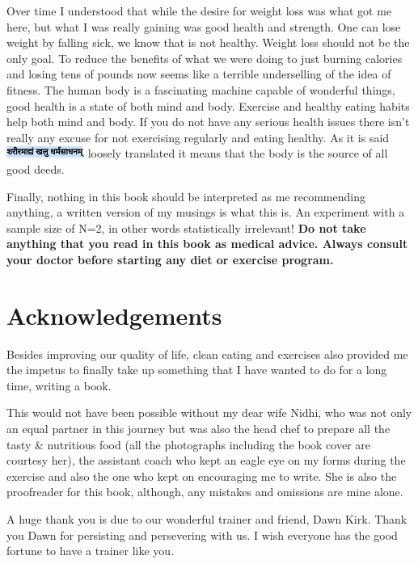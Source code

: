\documentclass[
  oneside]{book}
\begin{document}
Over time I understood that while the desire for weight loss was what got me here, but what I was really gaining was good health and strength. One can lose weight by falling sick, we know that is not healthy. Weight loss should not be the only goal. To reduce the benefits of what we were doing to just burning calories and losing tens of pounds now seems like a terrible underselling of the idea of fitness. The human body is a fascinating machine capable of wonderful things, good health is a state of both mind and body. Exercise and healthy eating habits help both mind and body. If you do not have any serious health issues there isn't really any excuse for not exercising regularly and eating healthy. As it is said \includegraphics{pictures/sanskrit1.png} loosely translated it means that the body is the source of all good deeds.

Finally, nothing in this book should be interpreted as me recommending anything, a written version of my musings is what this is. An experiment with a sample size of N=2, in other words statistically irrelevant! \textbf{Do not take anything that you read in this book as medical advice. Always consult your doctor before starting any diet or exercise program.}

\hypertarget{acknowledgements}{%
\section{Acknowledgements}\label{acknowledgements}}

Besides improving our quality of life, clean eating and exercises also provided me the impetus to finally take up something that I have wanted to do for a long time, writing a book.

This would not have been possible without my dear wife Nidhi, who was not only an equal partner in this journey but was also the head chef to prepare all the tasty \& nutritious food (all the photographs including the book cover are courtesy her), the assistant coach who kept an eagle eye on my forms during the exercise and also the one who kept on encouraging me to write. She is also the proofreader for this book, although, any mistakes and omissions are mine alone.

A huge thank you is due to our wonderful trainer and friend, Dawn Kirk. Thank you Dawn for persisting and persevering with us. I wish everyone has the good fortune to have a trainer like you.
\end{document}
